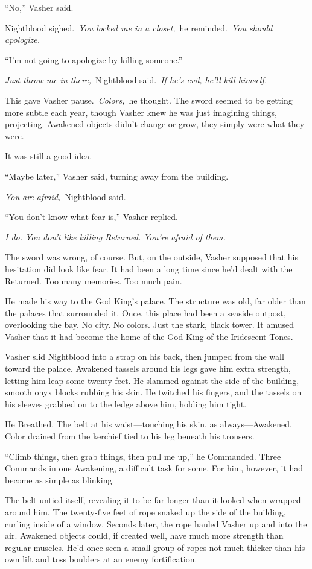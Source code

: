 “No,” Vasher said.

Nightblood sighed.~\textit{You locked me in a closet,}~he reminded.~\textit{You should apologize.}

“I’m not going to apologize by killing someone.”

\textit{Just throw me in there,}~Nightblood said.~\textit{If he’s evil, he’ll kill himself.}

This gave Vasher pause.~\textit{Colors,}~he thought. The sword seemed to be getting more subtle each year, though Vasher knew he was just imagining things, projecting. Awakened objects didn’t change or grow, they simply were what they were.

It was still a good idea.

“Maybe later,” Vasher said, turning away from the building.

\textit{You are afraid,}~Nightblood said.

“You don’t know what fear is,” Vasher replied.

\textit{I do. You don’t like killing Returned. You’re afraid of them.}

The sword was wrong, of course. But, on the outside, Vasher supposed that his hesitation did look like fear. It had been a long time since he’d dealt with the Returned. Too many memories. Too much pain.

He made his way to the God King’s palace. The structure was old, far older than the palaces that surrounded it. Once, this place had been a seaside outpost, overlooking the bay. No city. No colors. Just the stark, black tower. It amused Vasher that it had become the home of the God King of the Iridescent Tones.

Vasher slid Nightblood into a strap on his back, then jumped from the wall toward the palace. Awakened tassels around his legs gave him extra strength, letting him leap some twenty feet. He slammed against the side of the building, smooth onyx blocks rubbing his skin. He twitched his fingers, and the tassels on his sleeves grabbed on to the ledge above him, holding him tight.

He Breathed. The belt at his waist—touching his skin, as always—Awakened. Color drained from the kerchief tied to his leg beneath his trousers.

“Climb things, then grab things, then pull me up,” he Commanded. Three Commands in one Awakening, a difficult task for some. For him, however, it had become as simple as blinking.

The belt untied itself, revealing it to be far longer than it looked when wrapped around him. The twenty-five feet of rope snaked up the side of the building, curling inside of a window. Seconds later, the rope hauled Vasher up and into the air. Awakened objects could, if created well, have much more strength than regular muscles. He’d once seen a small group of ropes not much thicker than his own lift and toss boulders at an enemy fortification.

